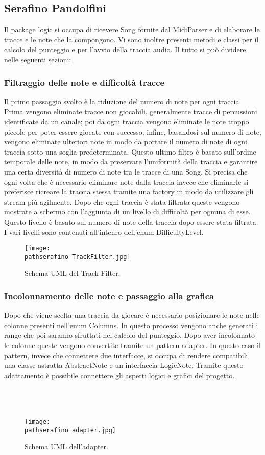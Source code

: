 \documentclass[a4paper,12pt]{report}
\newcommand\pathserafino{img/serafino/}
\begin{document}
\subsection{Serafino Pandolfini}
Il package logic si occupa di ricevere Song fornite dal MidiParser e di elaborare le tracce e le note che la compongono. Vi sono inoltre presenti metodi e classi per il calcolo del punteggio e per l'avvio della traccia audio. Il tutto si può dividere nelle seguenti sezioni:
\subsubsection{Filtraggio delle note e difficoltà tracce}
Il primo passaggio svolto è la riduzione del numero di note per ogni traccia. Prima vengono eliminate tracce non giocabili, generalmente tracce di percussioni identificate da un canale; poi da ogni traccia vengono eliminate le note troppo piccole per poter essere giocate con successo; infine, basandosi sul numero di note, vengono eliminate ulteriori note in modo da portare il numero di note di ogni traccia sotto una soglia predeterminata. Questo ultimo filtro è basato sull'ordine temporale delle note, in modo da preservare l'uniformità della traccia e garantire una certa diversità di numero di note tra le tracce di una Song. Si precisa che ogni volta che è necessario eliminare note dalla traccia invece che eliminarle si preferisce ricreare la traccia stessa tramite una factory in modo da utilizzare gli stream più agilmente.
Dopo che ogni traccia è stata filtrata queste vengono mostrate a schermo con l'aggiunta di un livello di difficoltà per ognuna di esse. Questo livello è basato sul numero di note della traccia dopo essere stata filtrata. I vari livelli sono contenuti all'intenro dell'enum DifficultyLevel.
\begin{figure}[!htb]
	\centerline{\texttt{[image: \\pathserafino TrackFilter.jpg]}}
	\caption{Schema UML del Track Filter.}
	\label{img:trackfilter}
\end{figure}
\clearpage \hfill\break
\subsubsection{Incolonnamento delle note e passaggio alla grafica}
Dopo che viene scelta una traccia da giocare è necessario posizionare le note nelle colonne presenti nell'enum Columns. In questo processo vengono anche generati i range che poi saranno sfruttati nel calcolo del punteggio. Dopo aver incolonnato le colonne queste vengono convertite tramite un pattern adapter. In questo caso il pattern, invece che connettere due interfacce, si occupa di rendere compatibili una classe astratta AbstractNote e un interfaccia LogicNote. Tramite questo adattamento è possibile connettere gli aspetti logici e grafici del progetto. \\ \\ \\ \\
\begin{figure}[!htb]
	\centerline{\texttt{[image: \\pathserafino adapter.jpg]}}
	\caption{Schema UML dell'adapter.}
	\label{img:incollamentonote}
\end{figure}
\clearpage \hfill\break
\end{document}
